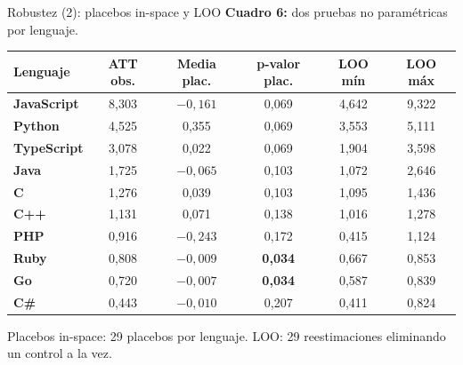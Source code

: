 \documentclass[10pt,aspectratio=169]{beamer}
\begin{document}
\begin{frame}{Robustez (2): placebos in-space y LOO}
\textbf{Cuadro 6:} dos pruebas no paramétricas por lenguaje.

\vspace{0.2em}
\renewcommand{\arraystretch}{1.28}
\setlength{\tabcolsep}{5pt}
\centering
\footnotesize
\begin{tabular}{lccccc}
\toprule
\textbf{Lenguaje} & \textbf{ATT obs.} & \textbf{Media plac.} & \textbf{p-valor plac.} & \textbf{LOO mín} & \textbf{LOO máx} \\
\midrule
\textbf{JavaScript} & 8,303 &  $-0,161$ & \alert{0,069} & 4,642 & 9,322 \\
\textbf{Python}     & 4,525 &   0,355   & \alert{0,069} & 3,553 & 5,111 \\
\textbf{TypeScript} & 3,078 &   0,022   & \alert{0,069} & 1,904 & 3,598 \\
\textbf{Java}       & 1,725 &  $-0,065$ & 0,103         & 1,072 & 2,646 \\
\textbf{C}          & 1,276 &   0,039   & 0,103         & 1,095 & 1,436 \\
\textbf{C++}        & 1,131 &   0,071   & 0,138         & 1,016 & 1,278 \\
\textbf{PHP}        & 0,916 &  $-0,243$ & 0,172         & 0,415 & 1,124 \\
\textbf{Ruby}       & 0,808 &  $-0,009$ & \alert{\textbf{0,034}} & 0,667 & 0,853 \\
\textbf{Go}         & 0,720 &  $-0,007$ & \alert{\textbf{0,034}} & 0,587 & 0,839 \\
\textbf{C\#}        & 0,443 &  $-0,010$ & 0,207         & 0,411 & 0,824 \\
\bottomrule
\end{tabular}

\vspace{0.4em}
\footnotesize Placebos in-space: 29 placebos por lenguaje. LOO: 29 reestimaciones eliminando un control a la vez.
\end{frame}
\end{document}
